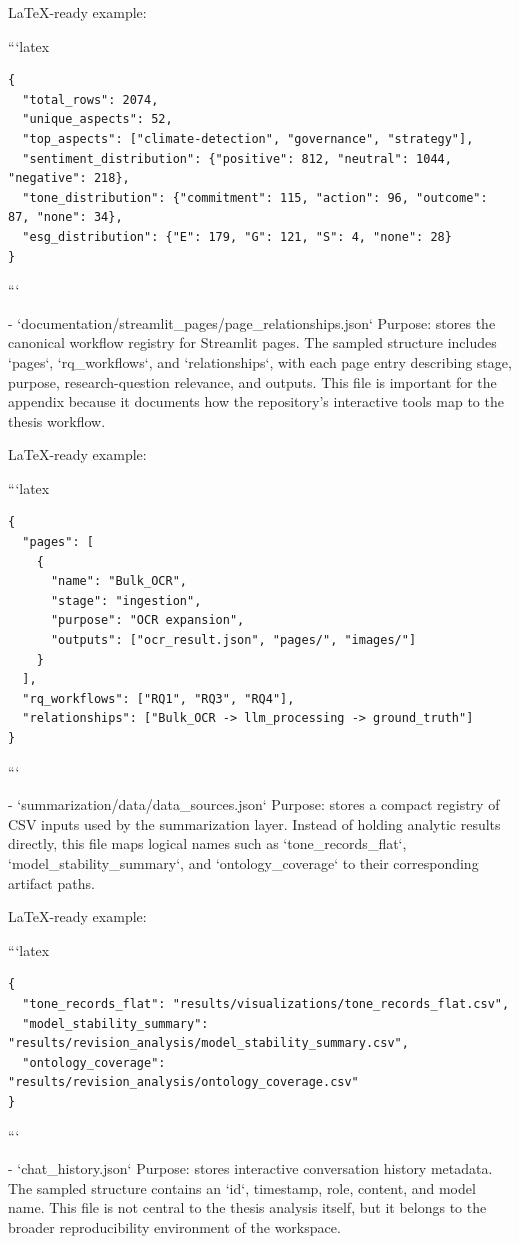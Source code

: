   LaTeX-ready example:

```latex
\begin{verbatim}
{
  "total_rows": 2074,
  "unique_aspects": 52,
  "top_aspects": ["climate-detection", "governance", "strategy"],
  "sentiment_distribution": {"positive": 812, "neutral": 1044, "negative": 218},
  "tone_distribution": {"commitment": 115, "action": 96, "outcome": 87, "none": 34},
  "esg_distribution": {"E": 179, "G": 121, "S": 4, "none": 28}
}
\end{verbatim}
```

- `documentation/streamlit_pages/page_relationships.json`
  Purpose:
  stores the canonical workflow registry for Streamlit pages.
  The sampled structure includes `pages`, `rq_workflows`, and `relationships`, with each page entry describing stage, purpose, research-question relevance, and outputs. This file is important for the appendix because it documents how the repository’s interactive tools map to the thesis workflow.

  LaTeX-ready example:

```latex
\begin{verbatim}
{
  "pages": [
    {
      "name": "Bulk_OCR",
      "stage": "ingestion",
      "purpose": "OCR expansion",
      "outputs": ["ocr_result.json", "pages/", "images/"]
    }
  ],
  "rq_workflows": ["RQ1", "RQ3", "RQ4"],
  "relationships": ["Bulk_OCR -> llm_processing -> ground_truth"]
}
\end{verbatim}
```

- `summarization/data/data_sources.json`
  Purpose:
  stores a compact registry of CSV inputs used by the summarization layer.
  Instead of holding analytic results directly, this file maps logical names such as `tone_records_flat`, `model_stability_summary`, and `ontology_coverage` to their corresponding artifact paths.

  LaTeX-ready example:

```latex
\begin{verbatim}
{
  "tone_records_flat": "results/visualizations/tone_records_flat.csv",
  "model_stability_summary": "results/revision_analysis/model_stability_summary.csv",
  "ontology_coverage": "results/revision_analysis/ontology_coverage.csv"
}
\end{verbatim}
```

- `chat_history.json`
  Purpose:
  stores interactive conversation history metadata.
  The sampled structure contains an `id`, timestamp, role, content, and model name. This file is not central to the thesis analysis itself, but it belongs to the broader reproducibility environment of the workspace.


